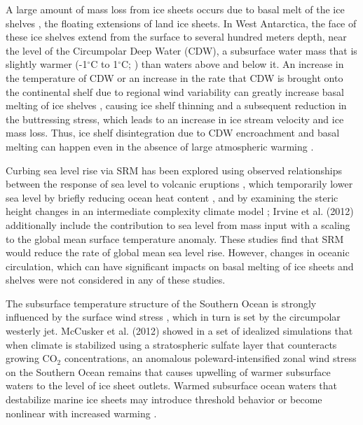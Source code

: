 \documentclass{nature}
\begin{document}
A large amount of mass loss from ice sheets occurs due to basal melt of the ice shelves \cite{joughin11}, the floating extensions of land ice sheets. In West Antarctica, the face of these ice shelves extend from the surface to several hundred meters depth, near the level of the Circumpolar Deep Water (CDW), a subsurface water mass that is slightly warmer (-1$^\circ$C to 1$^\circ$C; \cite{yin11}) than waters above and below it. An increase in the temperature of CDW or an increase in the rate that CDW is brought onto the continental shelf due to regional wind variability can greatly increase basal melting of ice shelves \cite{thoma08,joughin11}, causing ice shelf thinning and a subsequent reduction in the buttressing stress, which leads to an increase in ice stream velocity and ice mass loss\cite{oppenheimer98}. Thus, ice shelf disintegration due to CDW encroachment and basal melting can happen even in the absence of large atmospheric warming \cite{oppenheimer98}. %

Curbing sea level rise via SRM has been explored using observed relationships between the response of sea level to volcanic eruptions \cite{moore10}, which temporarily lower sea level by briefly reducing ocean heat content \cite{church05,gleckler06}, and by examining the steric height changes in an intermediate complexity climate model \cite{irvine12}; Irvine et al. (2012) additionally include the contribution to sea level from mass input with a scaling to the global mean surface temperature anomaly. These studies find that SRM would reduce the rate of global mean sea level rise. However, changes in oceanic circulation, which can have significant impacts on basal melting of ice sheets and shelves \cite{steig13,joughin11,thoma08} were not considered in any of these studies. 

The subsurface temperature structure of the Southern Ocean is strongly influenced by the surface wind stress \cite{fyfe07}, which in turn is set by the circumpolar westerly jet. McCusker et al. (2012) showed in a set of idealized simulations that when climate is stabilized using a stratospheric sulfate layer that counteracts growing CO$_2$ concentrations, an anomalous poleward-intensified zonal wind stress on the Southern Ocean remains that causes upwelling of warmer subsurface waters to the level of ice sheet outlets. Warmed subsurface ocean waters that destabilize marine ice sheets may introduce threshold behavior \cite{notz09} or become nonlinear with increased warming \cite{joughin14}.
\end{document}
